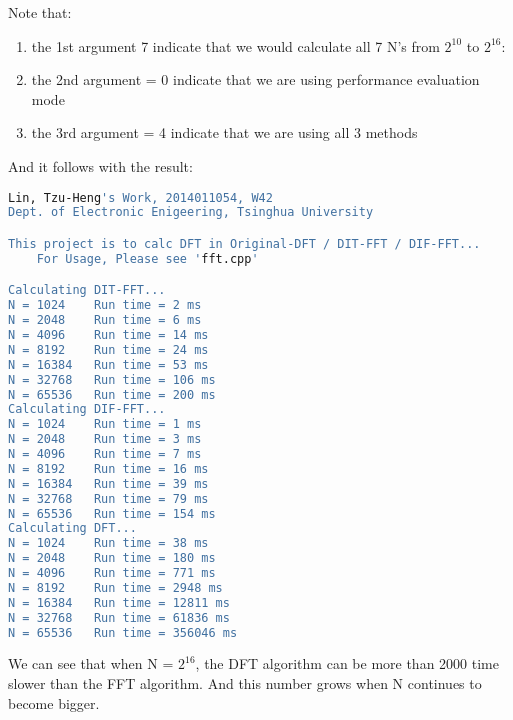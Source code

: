 \documentclass[UTF8,a4paper]{ctexart}
\begin{document}
Note that:

\begin{enumerate}
\item the 1st argument 7 indicate that we would calculate all 7 N's from $2^{10}$ to $2^{16}$:
\item the 2nd argument = 0 indicate that we are using performance evaluation mode
\item the 3rd argument = 4 indicate that we are using all 3 methods
\end{enumerate}    

And it follows with the result:

\begin{lstlisting}[language=sh]
Lin, Tzu-Heng's Work, 2014011054, W42
Dept. of Electronic Enigeering, Tsinghua University

This project is to calc DFT in Original-DFT / DIT-FFT / DIF-FFT...
	For Usage, Please see 'fft.cpp' 

Calculating DIT-FFT...
N = 1024	Run time = 2 ms
N = 2048	Run time = 6 ms
N = 4096	Run time = 14 ms
N = 8192	Run time = 24 ms
N = 16384	Run time = 53 ms
N = 32768	Run time = 106 ms
N = 65536	Run time = 200 ms
Calculating DIF-FFT...
N = 1024	Run time = 1 ms
N = 2048	Run time = 3 ms
N = 4096	Run time = 7 ms
N = 8192	Run time = 16 ms
N = 16384	Run time = 39 ms
N = 32768	Run time = 79 ms
N = 65536	Run time = 154 ms
Calculating DFT...
N = 1024	Run time = 38 ms
N = 2048	Run time = 180 ms
N = 4096	Run time = 771 ms
N = 8192	Run time = 2948 ms
N = 16384	Run time = 12811 ms
N = 32768	Run time = 61836 ms
N = 65536	Run time = 356046 ms
\end{lstlisting}
    
We can see that when N = $2^{16}$, the DFT algorithm can be more than 2000 time slower than the FFT algorithm. And this number grows when N continues to become bigger.

  
  
\end{document}
